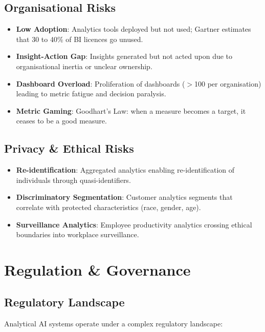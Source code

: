 \documentclass[12pt, a4paper]{article}
\begin{document}
\subsection{Organisational Risks}

\begin{itemize}
    \item \textbf{Low Adoption}: Analytics tools deployed but not used; Gartner estimates that 30 to 40\% of BI licences go unused.
    \item \textbf{Insight-Action Gap}: Insights generated but not acted upon due to organisational inertia or unclear ownership.
    \item \textbf{Dashboard Overload}: Proliferation of dashboards ($>$100 per organisation) leading to metric fatigue and decision paralysis.
    \item \textbf{Metric Gaming}: Goodhart's Law: when a measure becomes a target, it ceases to be a good measure.
\end{itemize}

\subsection{Privacy \& Ethical Risks}

\begin{itemize}
    \item \textbf{Re-identification}: Aggregated analytics enabling re-identification of individuals through quasi-identifiers.
    \item \textbf{Discriminatory Segmentation}: Customer analytics segments that correlate with protected characteristics (race, gender, age).
    \item \textbf{Surveillance Analytics}: Employee productivity analytics crossing ethical boundaries into workplace surveillance.
\end{itemize}

\section{Regulation \& Governance}\label{sec:governance}

\subsection{Regulatory Landscape}
Analytical AI systems operate under a complex regulatory landscape:
\end{document}
